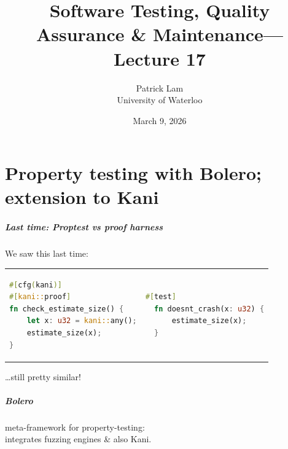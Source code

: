 \documentclass{beamer}
\title{Software Testing, Quality Assurance \& Maintenance---Lecture 17}
\author{Patrick Lam\\University of Waterloo}
\date{March 9, 2026}
\newenvironment{changemargin}[1]{%
  \begin{list}{}{%
    \setlength{\topsep}{0pt}%
    \setlength{\leftmargin}{#1}%
    \setlength{\rightmargin}{1em}
    \setlength{\listparindent}{\parindent}%
    \setlength{\itemindent}{\parindent}%
    \setlength{\parsep}{\parskip}%
  }%
  \item[]}{\end{list}}
\begin{document}
\begin{frame}
  \titlepage
\end{frame}

\part{Property testing with Bolero;\\ extension to Kani}
\begin{frame}
  \partpage
\end{frame}

\begin{frame}[fragile]
  \frametitle{Last time: Proptest vs proof harness}
  \begin{changemargin}{2cm}
{    \Large
    We saw this last time:}
  \end{changemargin}

  \begin{tabular}{ll}
    \scriptsize
      \begin{minipage}{.4\textwidth}
\begin{lstlisting}[language=Rust]
#[cfg(kani)]
#[kani::proof]
fn check_estimate_size() {
    let x: u32 = kani::any();
    estimate_size(x);
}
\end{lstlisting}
      \end{minipage} &
      \begin{minipage}{.4\textwidth}
    \scriptsize
\begin{lstlisting}[language=Rust]
  #[test]
  fn doesnt_crash(x: u32) {
      estimate_size(x);
  }
\end{lstlisting}
      \end{minipage}
    \end{tabular}

  \begin{changemargin}{2cm}
{    \Large
    \ldots still pretty similar! }
  \end{changemargin}

\end{frame}

\begin{frame}
  \frametitle{Bolero}
  \begin{changemargin}{2cm}
    \Large
    meta-framework for property-testing:\\
    integrates fuzzing engines \& also Kani.
  \end{changemargin}
\end{frame}
\end{document}
